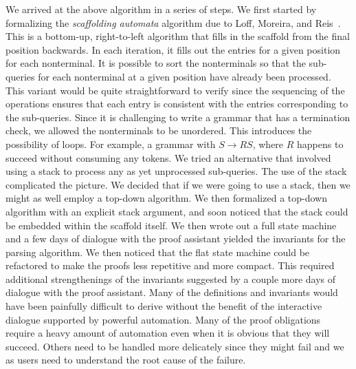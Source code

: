 \documentclass[sigplan,10pt,anonymous,review]{acmart}\settopmatter{printfolios=true,printccs=false,printacmref=false}
\newcommand{\prodn}[2]{#1 \rightarrow #2}
\begin{document}
\begin{CCSXML}
We arrived at the above algorithm in a series of steps.  We first
started by formalizing the \emph{scaffolding automata} algorithm due to Loff,
Moreira, and Reis~\cite{loff2020computational}\@.  This is a bottom-up, right-to-left algorithm that
fills in the scaffold from the final position backwards.  In each
iteration, it fills out the entries for a given position for each
nonterminal.  It is possible to sort the nonterminals so that the
sub-queries for each nonterminal at a given position have already been
processed.  This variant would be quite straightforward to verify
since the sequencing of the operations ensures that each entry is
consistent with the entries corresponding to the sub-queries.  Since
it is challenging to write a grammar that has a termination check, we
allowed the nonterminals to be unordered.  This introduces the
possibility of loops.  For example, a grammar with $\prodn{S}{R S}$,
where $R$ happens to succeed without consuming any tokens.  We tried
an alternative that involved using a stack to process any as yet
unprocessed sub-queries.  The use of the stack complicated the
picture.  We decided that if we were going to use a stack, then we
might as well employ a top-down algorithm.  We then formalized a
top-down algorithm with an explicit stack argument, and soon noticed
that the stack could be embedded within the scaffold itself.  We then
wrote out a full state machine and a few days of dialogue with the
proof assistant yielded the invariants for the parsing algorithm.  We
then noticed that the flat state machine could be refactored to make
the proofs less repetitive and more compact.  This required additional
strengthenings of the invariants suggested by a couple more days of
dialogue with the proof assistant.  Many of the definitions and
invariants would have been painfully difficult to derive without the
benefit of the interactive dialogue supported by powerful automation.
Many of the proof obligations require a heavy amount of automation
even when it is obvious that they will succeed.  Others need to be
handled more delicately since they might fail and we as users need to
understand the root cause of the failure.  




\end{CCSXML}
\end{document}
